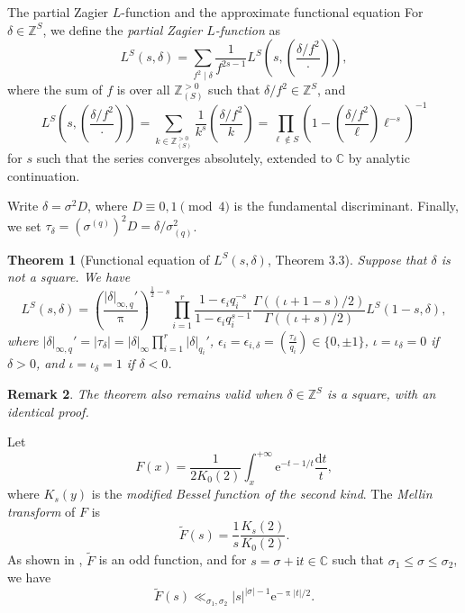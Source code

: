 \documentclass[10pt,oneside,reqno]{amsart}
\makeatletter
\newcommand\rmd{\mathrm{d}}
\newcommand\rme{\mathrm{e}}
\newcommand\rmi{\mathrm{i}}
\newcommand\CC{\mathbb{C}}
\newcommand\ZZ{\mathbb{Z}}
\renewcommand\leq{\leqslant}
\newcommand\legendresymbol[2]{\genfrac{(}{)}{}{}{#1}{#2}}
\def\subsection{\@startsection{subsection}{2}
  \z@{3pt\@plus0pt}{-.5em}%
  {\normalfont\bfseries}}
\theoremstyle{THEOREM}
\newtheorem{theorem}{Theorem}[section]
\theoremstyle{DEFINITION}
\theoremstyle{EXERCISE}
\newtheorem{remark}[theorem]{Remark}
\numberwithin{equation}{section}
\makeatother
\begin{document}
\subsection{The partial Zagier $L$-function and the approximate functional equation} 
For $\delta\in \ZZ^S$, we define the \emph{partial Zagier $L$-function} as
\[
L^{S}(s,\delta)=\sum_{f^2\mid \delta}\frac{1}{f^{2s-1}}L^{S}\left(s,\legendresymbol{\delta/f^2}{\cdot}\right),
\]
where the sum of $f$ is over all $\ZZ_{(S)}^{>0}$ such that $\delta/f^2\in \ZZ^S$, and
\[
L^{S}\left(s,\legendresymbol{\delta/f^2}{\cdot}\right)=\sum_{k\in \ZZ_{(S)}^{>0}}\frac{1}{k^s}\legendresymbol{\delta/f^2}{k}=\prod_{\ell\notin S}\left(1-\legendresymbol{\delta/f^2}{\ell}\ell^{-s}\right)^{-1}
\]
for $s$ such that the series converges absolutely, extended to $\CC$ by analytic continuation. 

Write $\delta=\sigma^2D$, where $D\equiv 0,1\pmod 4$ is the fundamental discriminant. Finally, we set $\tau_\delta=(\sigma^{(q)})^2D=\delta/\sigma_{(q)}^2$.
\begin{theorem}[Functional equation of $L^{S}(s,\delta)$, \cite{cheng2025} Theorem 3.3]\label{thm:funceqndelta}
Suppose that $\delta$ is not a square. We have
\begin{equation}\label{eq:funceqndelta}
L^{S}(s,\delta)=\legendresymbol{|\delta|_{\infty,q}'}{\uppi}^{\frac12-s} \prod_{i=1}^{r}\frac{1-\epsilon_i q_i^{-s}}{1-\epsilon_i q_i^{s-1}} \frac{\Gamma((\iota+1-s)/2)}{\Gamma((\iota+s)/2)}L^{S}(1-s,\delta),
\end{equation}
where $|\delta|_{\infty,q}'=|\tau_\delta|=|\delta|_\infty\prod_{i=1}^{r}|\delta|_{q_i}'$, $\epsilon_i=\epsilon_{i,\delta}=\legendresymbol{\tau_\delta}{q_i}\in \{0,\pm 1\}$, 
$\iota=\iota_\delta=0$ if $\delta>0$, and $\iota=\iota_\delta=1$ if $\delta<0$.
\end{theorem}
\begin{remark}
The theorem also remains valid when $\delta\in \ZZ^S$ is a square, with an identical proof.
\end{remark}
Let
\[
F(x)=\frac{1}{2K_0(2)}\int_{x}^{+\infty}\rme^{-t-1/t}\frac{\rmd t}{t},
\]
where $K_s(y)$ is the \emph{modified Bessel function of the second kind}. The \emph{Mellin transform} of $F$ is
\begin{equation}\label{eq:mellinf}
\widetilde{F}(s)=\frac{1}{s}\frac{K_s(2)}{K_0(2)}.
\end{equation}
As shown in \cite[Proposition 3.7]{cheng2025}, $\widetilde{F}$ is an odd function, and for $s=\sigma+\rmi t\in \CC$ such that $\sigma_1\leq \sigma\leq \sigma_2$, we have
\begin{equation}\label{eq:frapiddecay}
\widetilde{F}(s)\ll_{\sigma_1,\sigma_2} |s|^{|\sigma|-1}\rme^{-\uppi|t|/2}.
\end{equation}
\end{document}

